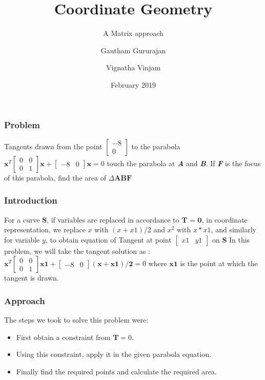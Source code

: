 \documentclass{beamer}
\title{Coordinate Geometry}
\subtitle{A Matrix approach}
\author{Gautham Gururajan \and Vignatha Vinjam}
\institute{Indian Institute of Technology Hyderabad}
\date{February 2019}
\begin{document}
 
\frame{\titlepage}
 
\begin{frame}
\frametitle{Problem}
Tangents drawn from the point $\begin{bmatrix}-8\\0
\end{bmatrix}$ to the parabola \newline
$\mathbf{x}^T \begin{bmatrix} 0 & 0 \\0 & 1
\end{bmatrix} \mathbf{x} + \begin{bmatrix} -8 & 0
\end{bmatrix} \mathbf{x} = 0$ \newline
\newline
touch the parabola at \textbf{\textit{A}} and \textbf{\textit{B}}. \newline
\newline
If \textbf{\textit{F}} is the focus of this parabola, find the area of $\Delta \mathbf{ABF}$ 

\end{frame}
\begin{frame}
\frametitle{Introduction}
For a curve $\textbf{S}$, if variables are replaced in accordance to $\textbf{T = 0}$,
\newline 
in coordinate representation, we replace $x$ with $(x+x1)/2$ and $x^{2}$ with $x*x1$, and similarly for variable $y$, to obtain equation of Tangent at point $\begin{bmatrix} x1 & y1
\end{bmatrix}$ on $\textbf{S}$
\newline
\newline
In this problem, we will take the tangent solution as : 
\newline
\newline
$\mathbf{x}^T \begin{bmatrix} 0 & 0 \\0 & 1
\end{bmatrix} \mathbf{x1} + \begin{bmatrix} -8 & 0
\end{bmatrix} \mathbf{(x + x1)/2} = 0$ \newline
\newline
where $\mathbf{x1}$ is the point at which the tangent is drawn.
\end{frame}

\begin{frame}
\frametitle{Approach}
The steps we took to solve this problem were:
\begin{itemize}
	\item<1-> First obtain a constraint from $\textbf{T} = 0$.
	\item<2-> Using this constraint, apply it in the given parabola equation.
	\item<3-> Finally find the required points and calculate the required area.
\end{itemize}

\end{frame}
\end{document}
